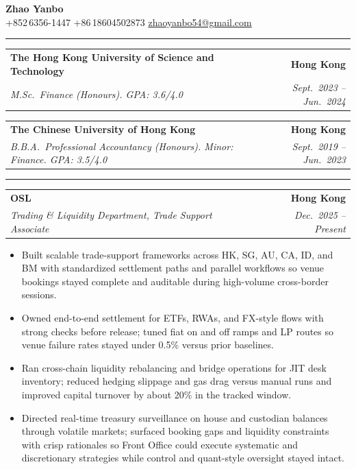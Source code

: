 \documentclass[9pt,a4paper]{extarticle}
\makeatletter
\newcommand{\ressection}[1]{%
  \vspace{0.8em}%
  \noindent{\large\scshape\bfseries #1}\par\nobreak
  \vspace{-\parskip}%
  \vspace{-\parskip}%
  \vspace{-\parskip}%
  \vspace{-\parskip}%
  \noindent\rule{\linewidth}{0.1pt}\par\nobreak
  \vspace{-\parskip}%
}
\newcommand{\resumeSubheading}[4]{%
  \vspace{0.6em}%
  \begin{tabular*}{\textwidth}{l@{\extracolsep{\fill}}r}
    \textbf{#1} & \textbf{#2} \\
    \textit{\small #3} & \textit{\small #4} \\
  \end{tabular*}\vspace{0.32em}}
\makeatother
\begin{document}
\begin{center}
  {\LARGE\bfseries Zhao Yanbo}\\[0.35em]
  \small
  +852\,6356-1447 \;\textbar\;
  +86\,18604502873 \;\textbar\;
  \href{mailto:zhaoyanbo54@gmail.com}{zhaoyanbo54@gmail.com}
\end{center}
\vspace{-0.2em}

\ressection{Education}

\resumeSubheading{The Hong Kong University of Science and Technology}{Hong Kong}{M.Sc.\ Finance (Honours). GPA: 3.6/4.0}{Sept.\ 2023 -- Jun.\ 2024}

\resumeSubheading{The Chinese University of Hong Kong}{Hong Kong}{B.B.A.\ Professional Accountancy (Honours). Minor: Finance. GPA: 3.5/4.0}{Sept.\ 2019 -- Jun.\ 2023}

\ressection{Work Experience}

\resumeSubheading{OSL}{Hong Kong}{Trading \& Liquidity Department, Trade Support Associate}{Dec.\ 2025 -- Present}
\begin{itemize}
  \item Built scalable trade-support frameworks across HK, SG, AU, CA, ID, and BM with standardized settlement paths and parallel workflows so venue bookings stayed complete and auditable during high-volume cross-border sessions.
  \item Owned end-to-end settlement for ETFs, RWAs, and FX-style flows with strong checks before release; tuned fiat on and off ramps and LP routes so venue failure rates stayed under 0.5\% versus prior baselines.
  \item Ran cross-chain liquidity rebalancing and bridge operations for JIT desk inventory; reduced hedging slippage and gas drag versus manual runs and improved capital turnover by about 20\% in the tracked window.
  \item Directed real-time treasury surveillance on house and custodian balances through volatile markets; surfaced booking gaps and liquidity constraints with crisp rationales so Front Office could execute systematic and discretionary strategies while control and quant-style oversight stayed intact.
\end{itemize}
\end{document}

